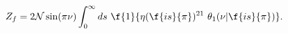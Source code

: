 \begin{equation}
Z_{f}=2{\cal N}\sin(\pi\nu)\int_{0}^{\infty} ds\
\f{1}{\eta(\f{is}{\pi})^{21}\ 
\theta_1(\nu|\f{is}{\pi})}.\label{oampf1}
\end{equation}

